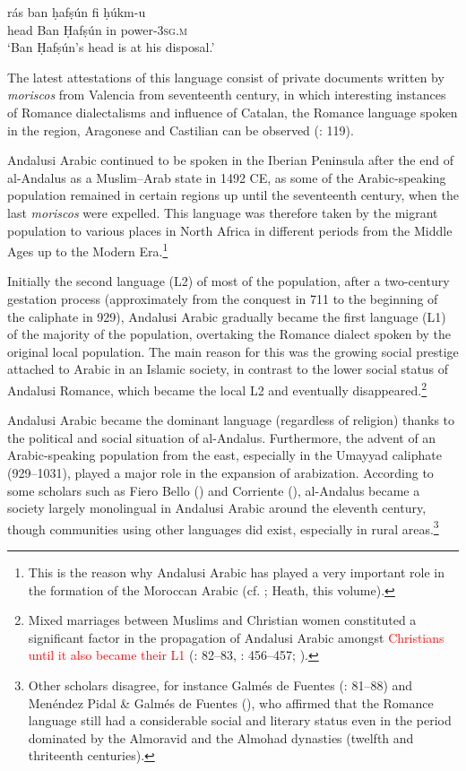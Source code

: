 \documentclass[output=paper,modfonts,nonflat]{langsci/langscibook}
\begin{document}
\ex\label{ex:key:}
\gll rás ban ḥafṣún fi ḥúkm-u \\
head Ban Ḥafṣún in power-\textsc{3sg.m}\\
\glt ‘Ban Ḥafṣún’s head is at his disposal.’
\z
\z

The latest attestations of this language consist of private documents written by \textit{moriscos} from Valencia from seventeenth century, in which interesting instances of Romance dialectalisms and influence of Catalan, the Romance language spoken in the region, Aragonese and Castilian can be observed (\citealt{BarcelóLabarta2009}: 119).

Andalusi Arabic continued to be spoken in the Iberian Peninsula after the end of al-Andalus as a Muslim–Arab state in 1492 CE, as some of the Arabic-speaking population remained in certain regions up until the seventeenth century, when the last \textit{moriscos} were expelled. This language was therefore taken by the migrant population to various places in North Africa in different periods from the Middle Ages up to the Modern Era.\footnote{This is the reason why Andalusi Arabic has played a very important role in the formation of the Moroccan Arabic (cf. \citealt{Vicente2010}; Heath, this volume).} 

Initially the second language (L2) of most of the population, after a two-century gestation process (approximately from the conquest in 711 to the beginning of the caliphate in 929), Andalusi Arabic gradually became the first language (L1) of the majority of the population, overtaking the Romance dialect spoken by the original local population. The main reason for this was the growing social prestige attached to Arabic in an Islamic society, in contrast to the lower social status of Andalusi Romance, which became the local L2 and eventually disappeared.\footnote{Mixed marriages between Muslims and Christian women constituted a significant factor in the propagation of Andalusi Arabic amongst \textcolor{red}{Christians until it also became their L1} (\citealt{Guichard1989}: 82–83, \citeyear{Guichard1995}: 456–457; \citealt{Chalmeta2003}).}  

Andalusi Arabic became the dominant language (regardless of religion) thanks to the political and social situation of al-Andalus. Furthermore, the advent of an Arabic-speaking population from the east, especially in the Umayyad caliphate (929--1031), played a major role in the expansion of arabization. According to some scholars such as Fiero Bello (\citeyear{FierroBello2001}) and Corriente (\citeyear[104]{Corriente2008}), al-Andalus became a society largely monolingual in Andalusi Arabic around the eleventh century, though communities using other languages did exist, especially in rural areas.\footnote{Other scholars disagree, for instance Galmés de Fuentes (\citeyear{GalmésdeFuentes1994}: 81–88) and Menéndez Pidal \& Galmés de Fuentes (\citeyear{MenéndezPidalGalmésdeFuentes2001}), who affirmed that the Romance language still had a considerable social and literary status even in the period dominated by the Almoravid and the Almohad dynasties (twelfth and thriteenth centuries).}  
\end{document}
